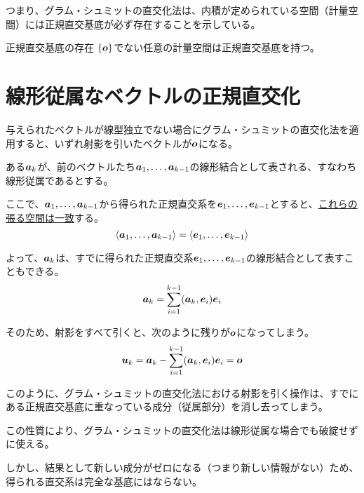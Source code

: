 \documentclass[../../../topic_linear-algebra]{subfiles}
\begin{document}
つまり、グラム・シュミットの直交化法は、内積が定められている空間（計量空間）には正規直交基底が必ず存在することを示している。

\begin{theorem}{正規直交基底の存在}
  $\{\vb*{o}\}$でない任意の計量空間は正規直交基底を持つ。
\end{theorem}

\sectionline
\section{線形従属なベクトルの正規直交化}\label{sec:gram-schmidt-with-dependent-vectors}

与えられたベクトルが線型独立でない場合にグラム・シュミットの直交化法を適用すると、いずれ射影を引いたベクトルが$\vb*{o}$になる。

\br

ある$\vb*{a}_k$が、前のベクトルたち$\vb*{a}_1,\ldots,\vb*{a}_{k-1}$の線形結合として表される、すなわち線形従属であるとする。

ここで、$\vb*{a}_1, \ldots, \vb*{a}_{k-1}$から得られた正規直交系を$\vb*{e}_1, \ldots, \vb*{e}_{k-1}$とすると、\hyperref[thm:gram-schmidt-span-invariance]{これらの張る空間は一致}する。
\begin{equation*}
  \langle \vb*{a}_1, \ldots, \vb*{a}_{k-1} \rangle = \langle \vb*{e}_1, \ldots, \vb*{e}_{k-1} \rangle
\end{equation*}

よって、$\vb*{a}_k$は、すでに得られた正規直交系$\vb*{e}_1,\ldots,\vb*{e}_{k-1}$の線形結合として表すこともできる。
\begin{equation*}
  \vb*{a}_k = \sum_{i = 1}^{k-1}(\vb*{a}_k, \vb*{e}_i) \vb*{e}_i
\end{equation*}

そのため、射影をすべて引くと、次のように残りが$\vb*{o}$になってしまう。
\begin{equation*}
  \vb*{u}_k = \vb*{a}_k - \sum_{i=1}^{k-1}(\vb*{a}_k, \vb*{e}_i) \vb*{e}_i = \vb*{o}
\end{equation*}

\br

このように、グラム・シュミットの直交化法における射影を引く操作は、すでにある正規直交基底に重なっている成分（従属部分）を消し去ってしまう。

この性質により、グラム・シュミットの直交化法は線形従属な場合でも破綻せずに使える。

\br

しかし、結果として新しい成分がゼロになる（つまり新しい情報がない）ため、得られる直交系は完全な基底にはならない。
\end{document}
